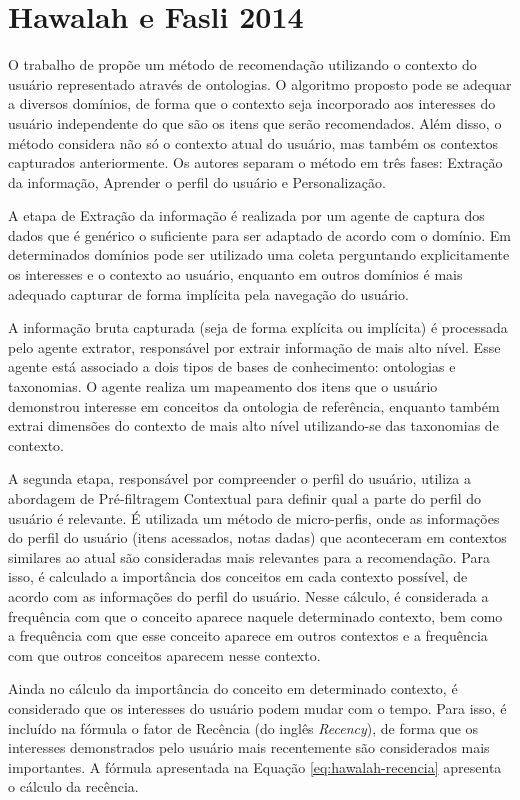 \section{Hawalah e Fasli 2014}

O trabalho de  propõe um método de recomendação utilizando o contexto do usuário
representado através de ontologias. O algoritmo proposto pode se adequar a diversos domínios, de forma que o contexto
seja incorporado aos interesses do usuário independente do que são os itens que serão recomendados. Além disso, o método
considera não só o contexto atual do usuário, mas também os contextos capturados anteriormente. Os autores separam o
método em três fases: Extração da informação, Aprender o perfil do usuário e Personalização.

A etapa de Extração da informação é realizada por um agente de captura dos dados que é genérico o suficiente para ser
adaptado de acordo com o domínio. Em determinados domínios pode ser utilizado uma coleta perguntando explicitamente os
interesses e o contexto ao usuário, enquanto em outros domínios é mais adequado capturar de forma implícita pela
navegação do usuário.

A informação bruta capturada (seja de forma explícita ou implícita) é processada pelo agente extrator, responsável por
extrair informação de mais alto nível. Esse agente está associado a dois tipos de bases de conhecimento: ontologias e
taxonomias. O agente realiza um mapeamento dos itens que o usuário demonstrou interesse em conceitos da ontologia de
referência, enquanto também extrai dimensões do contexto de mais alto nível utilizando-se das taxonomias de contexto.

A segunda etapa, responsável por compreender o perfil do usuário, utiliza a abordagem de Pré-filtragem Contextual para
definir qual a parte do perfil do usuário é relevante. É utilizada um método de micro-perfis, onde as
informações do perfil do usuário (itens acessados, notas dadas) que aconteceram em contextos similares ao atual são
consideradas mais relevantes para a recomendação. Para isso, é calculado a importância dos conceitos em cada contexto
possível, de acordo com as informações do perfil do usuário. Nesse cálculo, é considerada a frequência com que o
conceito aparece naquele determinado contexto, bem como a frequência com que esse conceito aparece em outros contextos
e a frequência com que outros conceitos aparecem nesse contexto.

Ainda no cálculo da importância do conceito em determinado contexto, é considerado que os interesses do usuário podem
mudar com o tempo. Para isso, é incluído na fórmula o fator de Recência (do inglês \textit{Recency}), de forma que os interesses
demonstrados pelo usuário mais recentemente são considerados mais importantes. A fórmula apresentada na Equação
\ref{eq:hawalah-recencia} apresenta o cálculo da recência.

